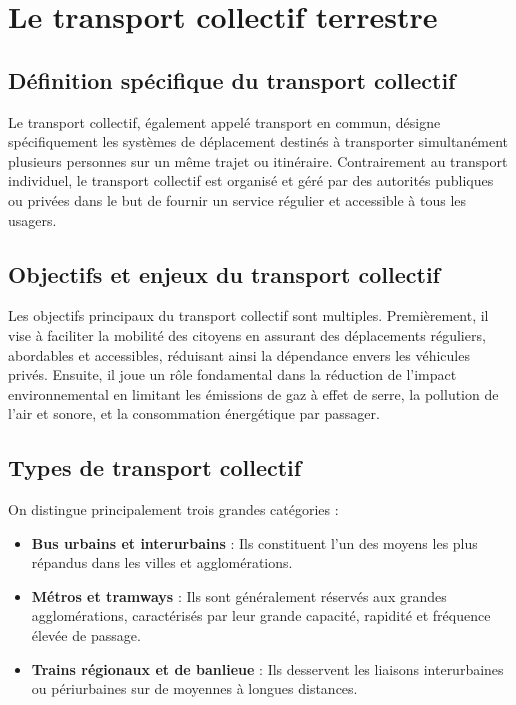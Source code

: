 \documentclass[a4paper, 12pt]{book}
\begin{document}
\section{Le transport collectif terrestre}

\subsection{Définition spécifique du transport collectif}
Le transport collectif, également appelé transport en commun, désigne spécifiquement les systèmes de déplacement destinés à transporter simultanément plusieurs personnes sur un même trajet ou itinéraire. Contrairement au transport individuel, le transport collectif est organisé et géré par des autorités publiques ou privées dans le but de fournir un service régulier et accessible à tous les usagers.

\subsection{Objectifs et enjeux du transport collectif}
Les objectifs principaux du transport collectif sont multiples. Premièrement, il vise à faciliter la mobilité des citoyens en assurant des déplacements réguliers, abordables et accessibles, réduisant ainsi la dépendance envers les véhicules privés. Ensuite, il joue un rôle fondamental dans la réduction de l'impact environnemental en limitant les émissions de gaz à effet de serre, la pollution de l'air et sonore, et la consommation énergétique par passager.

\subsection{Types de transport collectif}
On distingue principalement trois grandes catégories :
\begin{itemize}
    \item \textbf{Bus urbains et interurbains} : Ils constituent l'un des moyens les plus répandus dans les villes et agglomérations.
    \item \textbf{Métros et tramways} : Ils sont généralement réservés aux grandes agglomérations, caractérisés par leur grande capacité, rapidité et fréquence élevée de passage.
    \item \textbf{Trains régionaux et de banlieue} : Ils desservent les liaisons interurbaines ou périurbaines sur de moyennes à longues distances.
\end{itemize}
\end{document}
